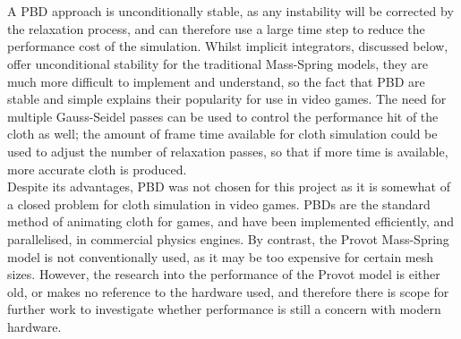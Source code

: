 \\\\A PBD approach is unconditionally stable, as any instability will be corrected by the relaxation process, and can therefore use a large time step to reduce the performance cost of the simulation. Whilst implicit integrators, discussed below, offer unconditional stability for the traditional Mass-Spring models, they are much more difficult to implement and understand, so the fact that PBD are stable and simple explains their popularity for use in video games. The need for multiple Gauss-Seidel passes can be used to control the performance hit of the cloth as well; the amount of frame time available for cloth simulation could be used to adjust the number of relaxation passes, so that if more time is available, more accurate cloth is produced.
\\Despite its advantages, PBD was not chosen for this project as it is somewhat of  a closed problem for cloth simulation in video games. PBDs are the standard method of animating cloth for games, and have been implemented efficiently, and parallelised, in commercial physics engines. By contrast, the Provot Mass-Spring model is not conventionally used, as it may be too expensive for certain mesh sizes. However, the research into the performance of the Provot model is either old, or makes no reference to the hardware used, and therefore there is scope for further work to investigate whether performance is still a concern with modern hardware.


